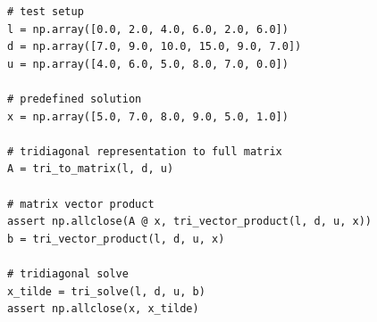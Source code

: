     \begin{codebox}
        \begin{verbatim}
            # test setup
            l = np.array([0.0, 2.0, 4.0, 6.0, 2.0, 6.0])
            d = np.array([7.0, 9.0, 10.0, 15.0, 9.0, 7.0])
            u = np.array([4.0, 6.0, 5.0, 8.0, 7.0, 0.0])

            # predefined solution
            x = np.array([5.0, 7.0, 8.0, 9.0, 5.0, 1.0])

            # tridiagonal representation to full matrix
            A = tri_to_matrix(l, d, u)

            # matrix vector product
            assert np.allclose(A @ x, tri_vector_product(l, d, u, x))
            b = tri_vector_product(l, d, u, x)

            # tridiagonal solve
            x_tilde = tri_solve(l, d, u, b)
            assert np.allclose(x, x_tilde)
        \end{verbatim}
        \caption{Continuation of Code-Snippet \ref{code:tridiag_task2}.}
        \label{code:tridiag_task3}
    \end{codebox}

